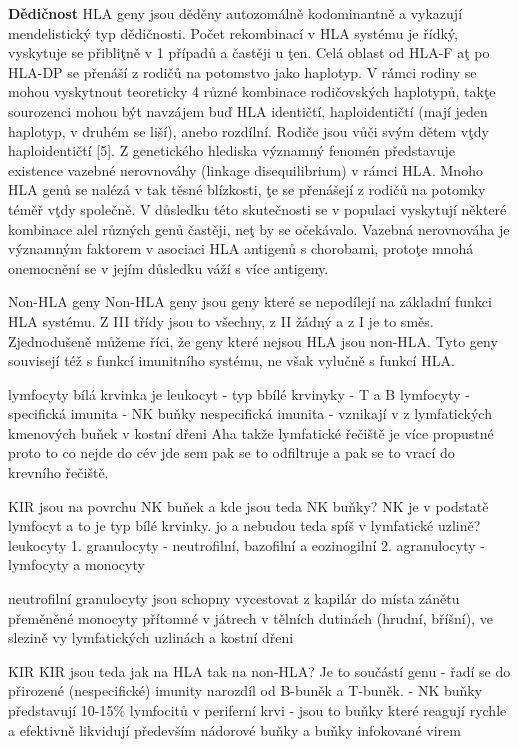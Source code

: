 \documentclass[czech,DP]{thesiskiv}
\begin{document}
\textbf{Dědičnost}
HLA geny jsou děděny autozomálně kodominantně a vykazují mendelistický typ
dědičnosti. Počet rekombinací v HLA systému je řídký, vyskytuje se přibliţně v 1 %
případů a častěji u ţen. Celá oblast od HLA-F aţ po HLA-DP se přenáší z rodičů na
potomstvo jako haplotyp. V rámci rodiny se mohou vyskytnout teoreticky 4 různé
kombinace rodičovských haplotypů, takţe sourozenci mohou být navzájem buď HLA
identičtí, haploidentičtí (mají jeden haplotyp, v druhém se liší), anebo rozdílní. Rodiče jsou
vůči svým dětem vţdy haploidentičtí [5]. Z genetického hlediska významný fenomén
představuje existence vazebné nerovnováhy (linkage disequilibrium) v rámci HLA. Mnoho
HLA genů se nalézá v tak těsné blízkosti, ţe se přenášejí z rodičů na potomky téměř vţdy
společně. V důsledku této skutečnosti se v populaci vyskytují některé kombinace alel
různých genů častěji, neţ by se očekávalo. Vazebná nerovnováha je významným faktorem
v asociaci HLA antigenů s chorobami, protoţe mnohá onemocnění se v jejím důsledku
váží s více antigeny.

Non-HLA geny
Non-HLA geny jsou geny které se nepodílejí na základní funkci HLA systému. Z III třídy jsou to všechny, z II žádný a z I je to směs. Zjednodušeně můžeme říci, že geny které nejsou HLA jsou non-HLA. Tyto geny souvisejí též s funkcí imunitního systému, ne však vylučně s funkcí HLA. 

lymfocyty 
bílá krvinka je leukocyt
- typ bbílé krvinyky 
- T a B lymfocyty - specifická imunita
- NK buňky nespecifická imunita
- vznikají v z lymfatických kmenových buňek v kostní dřeni
Aha takže lymfatické řečiště je více propustné proto to co nejde do cév jde sem pak se to odfiltruje a pak se to vrací do krevního řečiště.

KIR jsou na povrchu NK buňek a kde jsou teda NK buňky? 
NK je v podstatě lymfocyt a to je typ bílé krvinky. jo a nebudou teda spíš  v lymfatické uzlině? 
leukocyty 1. granulocyty - neutrofilní, bazofilní a eozinogilní
		2. agranulocyty - lymfocyty a monocyty
		
neutrofilní granulocyty jsou schopny vycestovat z kapilár do místa zánětu
přeměněné monocyty přítomné v játrech v tělních dutinách (hrudní, bříšní), ve slezině vy lymfatických uzlinách a kostní dřeni

KIR
KIR jsou teda jak na HLA tak na non-HLA? Je to součástí genu
- řadí se do přirozené (nespecifické) imunity narozdíl od B-buněk a T-buněk.
- NK buňky představují 10-15\% lymfocitů v periferní krvi
- jsou to buňky které reagují rychle a efektivně likvidují především nádorové buňky a buňky infokované virem
\end{document}
